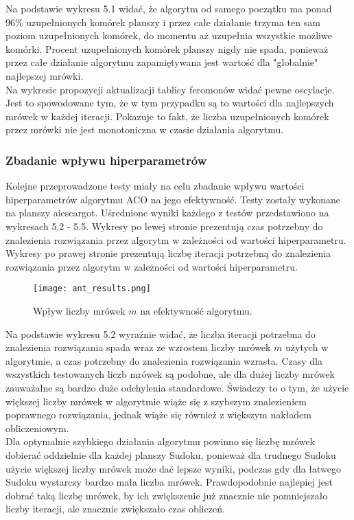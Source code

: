 \documentclass[11pt]{scrartcl} %
\begin{document}
Na podstawie wykresu 5.1 widać, że algorytm od samego początku ma ponad $96\%$ uzupełnionych komórek planszy i przez całe działanie trzyma ten sam poziom uzupełnionych komórek, do momentu aż uzupełnia wszystkie możliwe komórki. Procent uzupełnionych komórek planszy nigdy nie spada, ponieważ przez całe działanie algorytmu zapamiętywana jest wartość dla "globalnie" najlepszej mrówki. \\
Na wykresie propozycji aktualizacji tablicy feromonów widać pewne oscylacje. Jest to spowodowane tym, że w tym przypadku są to wartości dla najlepszych mrówek w każdej iteracji. Pokazuje to fakt, że liczba uzupełnionych komórek przez mrówki nie jest monotoniczna w czasie działania algorytmu.

\subsubsection{Zbadanie wpływu hiperparametrów}
Kolejne przeprowadzone testy miały na celu zbadanie wpływu wartości hiperparametrów algorytmu ACO na jego efektywność. Testy zostały wykonane na planszy aiescargot. Uśrednione wyniki każdego z testów przedstawiono na wykresach 5.2 - 5.5. Wykresy po lewej stronie prezentują czas potrzebny do znalezienia rozwiązania przez algorytm w zależności od wartości hiperparametru. Wykresy po prawej stronie prezentują liczbę iteracji potrzebną do znalezienia rozwiązania przez algorytm w zależności od wartości hiperparametru.\\


\begin{figure}[h] %
        \centering
        \texttt{[image: ant\_results.png]} %
        \caption{Wpływ liczby mrówek $m$ na efektywność algorytmu.}
\end{figure}

Na podstawie wykresu 5.2 wyraźnie widać, że liczba iteracji potrzebna do znalezienia rozwiązania spada wraz ze wzrostem liczby mrówek $m$ użytych w algorytmie, a czas potrzebny do znalezienia rozwiązania wzrasta. Czasy dla wszystkich testowanych liczb mrówek są podobne, ale dla dużej liczby mrówek zauważalne są bardzo duże odchylenia standardowe. Świadczy to o tym, że użycie większej liczby mrówek w algorytmie wiąże się z szybszym znalezieniem poprawnego rozwiązania, jednak wiąże się również z większym nakładem obliczeniowym.\\
Dla optymalnie szybkiego działania algorytmu powinno się liczbę mrówek dobierać oddzielnie dla każdej planszy Sudoku, ponieważ dla trudnego Sudoku użycie większej liczby mrówek może dać lepsze wyniki, podczas gdy dla łatwego Sudoku wystarczy bardzo mała liczba mrówek. Prawdopodobnie najlepiej jest dobrać taką liczbę mrówek, by ich zwiększenie już znacznie nie pomniejszało liczby iteracji, ale znacznie zwiększało czas obliczeń.
\end{document}
